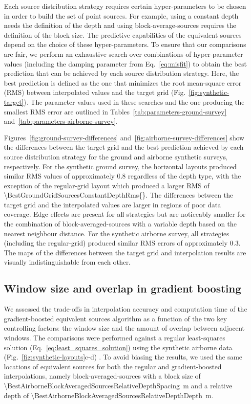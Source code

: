 \documentclass[twocolumn]{article}
\begin{document}
Each source distribution strategy requires certain hyper-parameters to be
chosen in order to build the set of point sources.
For example, using a constant depth needs the definition of the depth and using
block-average-sources requires the definition of the block size.
The predictive capabilities of the equivalent sources depend on the choice of
these hyper-parameters.
To ensure that our comparisons are fair, we perform an exhaustive search over
combinations of hyper-parameter values (including the damping parameter from
Eq.~\ref{eq:misfit}) to obtain the best prediction that can be achieved by each
source distribution strategy.
Here, the best prediction is defined as the one that minimizes the root
mean-square error (RMS) between interpolated values and the target grid
(Fig.~\ref{fig:synthetic-target}).
The parameter values used in these searches and the one producing the smallest
RMS error are outlined in Tables~\ref{tab:parameters-ground-survey}
and~\ref{tab:parameters-airborne-survey}.

Figures~\ref{fig:ground-survey-differences}
and~\ref{fig:airborne-survey-differences} show the differences between the
target grid and the best prediction achieved by each source distribution
strategy for the ground and airborne synthetic surveys, respectively.
For the synthetic ground survey, the horizontal layouts produced similar RMS
values of approximately \SI{0.8}{\mgal} regardless of the depth type, with the
exception of the regular-grid layout which produced a larger RMS of
\SI{\BestGroundGridSourcesConstantDepthRms{}}{\mgal}.
The differences between the target grid and the interpolated values are larger
in regions of poor data coverage.
Edge effects are present for all strategies but are noticeably smaller for the
combination of block-averaged-sources with a variable depth based on the
nearest neighbour distance.
For the synthetic airborne survey, all strategies (including the regular-grid)
produced similar RMS errors of approximately \SI{0.3}{\mgal}.
The maps of the differences between the target grid and interpolation results
are visually indistinguishable from each other.



\subsection{Window size and overlap in gradient boosting}

We assessed the trade-offs in interpolation accuracy and computation time of
the gradient-boosted equivalent sources algorithm as a function of the two key
controlling factors: the window size and the amount of overlap between adjacent
windows.
The comparisons were performed against a regular least-squares solution
(Eq.~\ref{eq:least_squares_solution}) using the synthetic airborne data
(Fig.~\ref{fig:synthetic-layouts}c-d) .
To avoid biasing the results, we used the same locations of equivalent sources
for both the regular and gradient-boosted interpolations, namely
block-averaged-sources with a block size of
\SI{\BestAirborneBlockAveragedSourcesRelativeDepthSpacing}{\meter} and a
relative depth of
\SI{\BestAirborneBlockAveragedSourcesRelativeDepthDepth}{\meter}.
\end{document}
